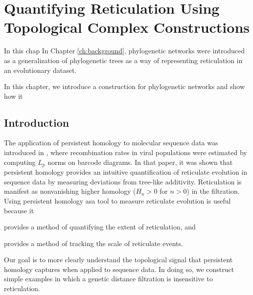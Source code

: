 \chapter{Quantifying Reticulation Using Topological Complex Constructions}
\label{ch:complex_construction}

In this chap
In Chapter \ref{ch:background}, phylogenetic networks were introduced as a generalization of phylogenetic trees as a way of representing reticulation in an evolutionary dataset.

In this chapter, we introduce a construction for phylogenetic networks and show how it 

\section{Introduction}
\label{sec:introduction}

The application of persistent homology to molecular sequence data was introduced in \autocite{Chan:2013}, where recombination rates in viral populations were estimated by computing $L_p$ norms on barcode diagrams.
In that paper, it was shown that persistent homology provides an intuitive quantification of reticulate evolution in sequence data by measuring deviations from tree-like additivity.
Reticulation is manifest as nonvanishing higher homology ($H_{n}>0$ for $n>0$) in the filtration.
Using persistent homology asa tool to measure reticulate evolution is useful because it

\begin{inparaenum}[(1)]
\item provides a method of quantifying the extent of reticulation, and
\item provides a method of tracking the scale of reticulate events.
\end{inparaenum}

Our goal is to more clearly understand the topological signal that persistent homology captures when applied to sequence data.
In doing so, we construct simple examples in which a genetic distance filtration is insensitive to reticulation.


